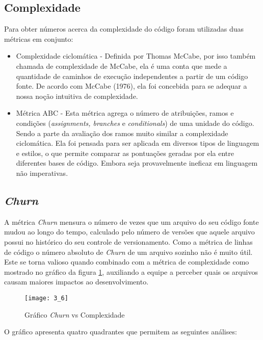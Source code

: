 \subsection{Complexidade}

Para obter números acerca da complexidade do código foram utilizadas duas métricas em conjunto:

\begin{itemize}
    \item Complexidade ciclomática - Definida por Thomas McCabe, por isso também chamada de complexidade de McCabe, ela é uma conta que mede a quantidade de caminhos de execução independentes a partir de um código fonte. De acordo com McCabe (1976), ela foi concebida para se adequar a nossa noção intuitiva de complexidade.
    \item Métrica ABC - Esta métrica agrega o número de atribuições, ramos e condições (\textit{assignments, branches} e \textit{conditionals}) de uma unidade do código. Sendo a parte da avaliação dos ramos muito similar a complexidade ciclomática. Ela foi pensada para ser aplicada em diversos tipos de linguagem e estilos, o que permite comparar as pontuações geradas por ela entre diferentes bases de código. Embora seja provavelmente ineficaz em linguagem não imperativas.
\end{itemize}

\subsection{\textit{Churn}}

A métrica \textit{Churn} mensura o número de vezes que um arquivo do seu código fonte mudou ao longo do tempo, calculado pelo número de versões que aquele arquivo possui no histórico do seu controle de versionamento. Como a métrica de linhas de código o número absoluto de \textit{Churn} de um arquivo sozinho não é muito útil. Este se torna valioso quando combinado com a métrica de complexidade como mostrado no gráfico da figura \ref{figura6}, auxiliando a equipe a perceber quais os arquivos causam maiores impactos ao desenvolvimento.

\begin{figure}[H]
    \centering
\texttt{[image: 3\_6]}
    \caption{Gráfico \textit{Churn} vs Complexidade}
    \label{figura6}
\end{figure}

O gráfico apresenta quatro quadrantes que permitem as seguintes análises: 


